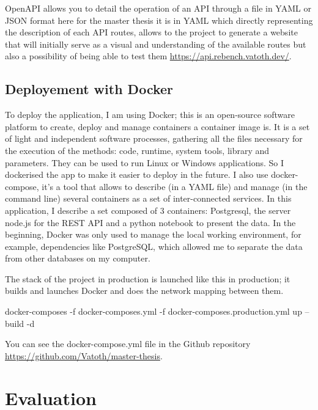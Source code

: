 \documentclass{article}
\begin{document}
OpenAPI allows you to detail the operation of an API through a file in YAML or JSON format here for the master thesis it is in YAML which directly representing the description of each API routes, allows to the project to generate a website that will initially serve as a visual and understanding of the available routes but also a possibility of being able to test them \url{https://api.rebench.vatoth.dev/}.



\subsection{Deployement with Docker}

To deploy the application, I am using Docker; this is an open-source software platform to create, deploy and manage containers a container image is. It is a set of light and independent software processes, gathering all the files necessary for the execution of the methods: code, runtime, system tools, library and parameters. They can be used to run Linux or Windows applications. So I dockerised the app to make it easier to deploy in the future. I also use docker-compose, it's a tool that allows to describe (in a YAML file) and manage (in the command line) several containers as a set of inter-connected services. In this application, I describe a set composed of 3 containers: Postgresql, the server node.js for the REST API and a python notebook to present the data. In the beginning, Docker was only used to manage the local working environment, for example, dependencies like PostgreSQL, which allowed me to separate the data from other databases on my computer.

The stack of the project in production is launched like this in production; it builds and launches Docker and does the network mapping between them.

docker-composes -f docker-composes.yml -f docker-composes.production.yml up --build -d

You can see the docker-compose.yml file in the Github repository \url{https://github.com/Vatoth/master-thesis}. 

\section{Evaluation}
\end{document}
